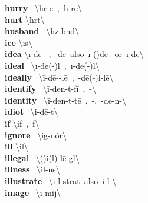 \documentclass[10pt,a4paper]{article}
\begin{document}
\begin{multicols}{2}
\textbf{ hurry }\quad \ \textbackslash \textprimstress h\textschwa r-\={e}\ ,\ \textprimstress h\textschwa -r\={e}\textbackslash \\
\textbf{ hurt }\quad \textbackslash \textprimstress h\textschwa rt\textbackslash \\
\textbf{ husband }\quad \ \textbackslash \textprimstress h\textschwa z-b\textschwa nd\textbackslash \\
\textbf{ ice }\quad \textbackslash \textprimstress \={i}s\textbackslash \\
\textbf{ idea }\quad \textbackslash \={i}-\textprimstress d\={e}-\textschwa \ ,\ -\textprimstress d\={e}\textschwa \ also\ \textprimstress \={i}-(\textsecstress )d\={e}-\textschwa \ or\ \textprimstress \={i}-d\={e}\textbackslash \\
\textbf{ ideal }\quad \ \textbackslash \={i}-\textprimstress d\={e}(-\textschwa )l\ ,\ \textprimstress \={i}-\textsecstress d\={e}(-\textschwa )l\textbackslash \\
\textbf{ ideally }\quad \ \textbackslash \={i}-\textprimstress d\={e}-\textschwa -l\={e}\ ,\ -\textprimstress d\={e}(-\textschwa )l-l\={e}\textbackslash \\
\textbf{ identify }\quad \ \textbackslash \={i}-\textprimstress den-t\textschwa -\textsecstress f\={i}\ ,\ \textschwa -\textbackslash \\
\textbf{ identity }\quad \ \textbackslash \={i}-\textprimstress den-t\textschwa -t\={e}\ ,\ \textschwa -,\ -\textprimstress de-n\textschwa -\textbackslash \\
\textbf{ idiot }\quad \ \textbackslash \textprimstress i-d\={e}-\textschwa t\textbackslash \\
\textbf{ if }\quad \textbackslash \textprimstress if\ ,\ \textschwa f\textbackslash \\
\textbf{ ignore }\quad \ \textbackslash ig-\textprimstress n\.{o}r\textbackslash \\
\textbf{ ill }\quad \textbackslash \textprimstress il\textbackslash \\
\textbf{ illegal }\quad \ \textbackslash (\textsecstress )i(l)-\textprimstress l\={e}-g\textschwa l\textbackslash \\
\textbf{ illness }\quad \ \textbackslash \textprimstress il-n\textschwa s\textbackslash \\
\textbf{ illustrate }\quad \ \textbackslash \textprimstress i-l\textschwa -\textsecstress str\={a}t\ also\ i-\textprimstress l\textschwa -\textbackslash \\
\textbf{ image }\quad \ \textbackslash \textprimstress i-mij\textbackslash \\

\end{multicols}
\end{document}
